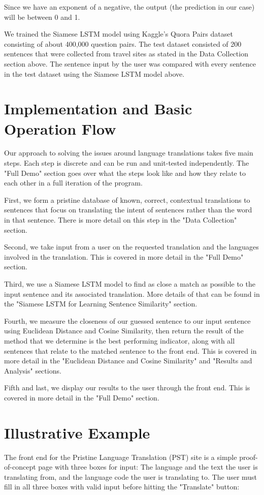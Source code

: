 \documentclass[runningheads]{llncs}
\begin{document}
	Since we have an exponent of a negative, the output (the prediction in our case) will be between 0 and 1.
	
	We trained the Siamese LSTM model using Kaggle's Quora Pairs dataset~\cite{ref_url25} consisting of about 400,000 question pairs. The test dataset consisted of 200 sentences that were collected from travel sites as stated in the Data Collection section above. The sentence input by the user was compared with every sentence in the test dataset using the Siamese LSTM model above.

	\section{Implementation and Basic Operation Flow}
	Our approach to solving the issues around language translations takes five main steps. Each step is discrete and can be run and unit-tested independently. The "Full Demo" section goes over what the steps look like and how they relate to each other in a full iteration of the program. 

	First, we form a pristine database of known, correct, contextual translations to sentences that focus on translating the intent of sentences rather than the word in that sentence. There is more detail on this step in the "Data Collection" section. 

	Second, we take input from a user on the requested translation and the languages involved in the translation. This is covered in more detail in the "Full Demo" section. 

	Third, we use a Siamese LSTM model to find as close a match as possible to the input sentence and its associated translation.  More details of that can be found in the "Siamese LSTM for Learning Sentence Similarity" section. 

	Fourth, we measure the closeness of our guessed sentence to our input sentence using Euclidean Distance and Cosine Similarity, then return the result of the method that we determine is the best performing indicator, along with all sentences that relate to the matched sentence to the front end. This is covered in more detail in the "Euclidean Distance and Cosine Similarity" and "Results and Analysis" sections.

	Fifth and last, we display our results to the user through the front end. This is covered in more detail in the "Full Demo" section.
	
	
	\section{Illustrative Example}
	The front end for the Pristine Language Translation (PST) site is a simple proof-of-concept page with three boxes for input: The language and the text the user is translating from, and the language code the user is translating to. The user must fill in all three boxes with valid input before hitting the "Translate" button:
\end{document}
